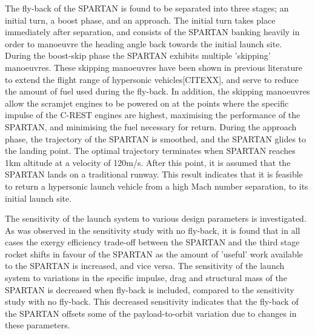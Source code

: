 The fly-back of the SPARTAN is found to be separated into three stages; an initial turn, a boost phase, and an approach. 
The initial turn takes place immediately after separation, and consists of the SPARTAN banking heavily in order to manoeuvre the heading angle back towards the initial launch site. 
During the boost-skip phase the SPARTAN exhibits multiple 'skipping' manoeuvres. These skipping manoeuvres have been shown in previous literature to extend the flight range of hypersonic vehicles[CITEXX], and serve to reduce the amount of fuel used during the fly-back.
In addition, the skipping manoeuvres allow the scramjet engines to be powered on at the points where the specific impulse of the C-REST engines are highest, maximising the performance of the SPARTAN, and minimising the fuel necessary for return. 
During the approach phase, the trajectory of the SPARTAN is smoothed, and the SPARTAN glides to the landing point. 
 The optimal trajectory terminates when SPARTAN reaches 1km altitude at a velocity of 120m/s. After this point, it is assumed that the SPARTAN lands on a traditional runway.  
This result indicates that it is feasible to return a hypersonic launch vehicle from a high Mach number separation, to its initial launch site.  

The sensitivity of the launch system to various design parameters is investigated. As was observed in the sensitivity study with no fly-back, it is found that in all cases the exergy efficiency trade-off between the SPARTAN and the third stage rocket shifts in favour of the SPARTAN as the amount of 'useful' work available to the SPARTAN is increased, and vice versa. 
The sensitivity of the launch system to variations in the specific impulse, drag and structural mass of the SPARTAN is decreased when fly-back is included, compared to the sensitivity study with no fly-back. This decreased sensitivity indicates that the fly-back of the SPARTAN offsets some of the payload-to-orbit variation due to changes in these parameters. 

